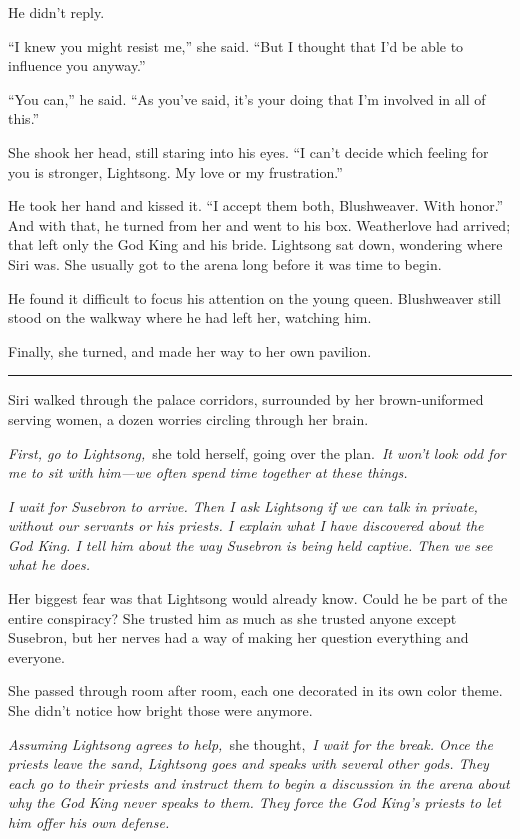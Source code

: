 He didn’t reply.

“I knew you might resist me,” she said. “But I thought that I’d be able to influence you anyway.”

“You can,” he said. “As you’ve said, it’s your doing that I’m involved in all of this.”

She shook her head, still staring into his eyes. “I can’t decide which feeling for you is stronger, Lightsong. My love or my frustration.”

He took her hand and kissed it. “I accept them both, Blushweaver. With honor.” And with that, he turned from her and went to his box. Weatherlove had arrived; that left only the God King and his bride. Lightsong sat down, wondering where Siri was. She usually got to the arena long before it was time to begin.

He found it difficult to focus his attention on the young queen. Blushweaver still stood on the walkway where he had left her, watching him.

Finally, she turned, and made her way to her own pavilion.

\bigskip \hrule \bigskip

Siri walked through the palace corridors, surrounded by her brown-uniformed serving women, a dozen worries circling through her brain.

\textit{First, go to Lightsong,}~she told herself, going over the plan.~\textit{It won’t look odd for me to sit with him—we often spend time together at these things.}

\textit{I wait for Susebron to arrive. Then I ask Lightsong if we can talk in private, without our servants or his priests. I explain what I have discovered about the God King. I tell him about the way Susebron is being held captive. Then we see what he does.}

Her biggest fear was that Lightsong would already know. Could he be part of the entire conspiracy? She trusted him as much as she trusted anyone except Susebron, but her nerves had a way of making her question everything and everyone.

She passed through room after room, each one decorated in its own color theme. She didn’t notice how bright those were anymore.

\textit{Assuming Lightsong agrees to help,}~she thought,~\textit{I wait for the break. Once the priests leave the sand, Lightsong goes and speaks with several other gods. They each go to their priests and instruct them to begin a discussion in the arena about why the God King never speaks to them. They force the God King’s priests to let him offer his own defense.}


